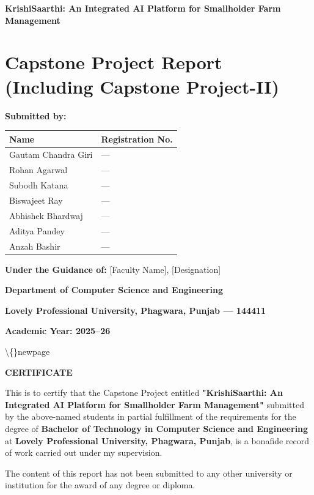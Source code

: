 \documentclass[12pt, a4paper]{report}
\begin{document}
\begin{center}
{\fontsize{14}{17}\bfseries KrishiSaarthi: An Integrated AI Platform for Smallholder Farm Management}\\
\end{center}
\section{Capstone Project Report (Including Capstone Project-II)}
\textbf{Submitted by:}

\begin{table}[htbp]
\centering
\small
\begin{tabularx}{\textwidth}{|X|X|}
\hline
Name & Registration No. \\
\hline
Gautam Chandra Giri & --- \\
Rohan Agarwal & --- \\
Subodh Katana & --- \\
Biswajeet Ray & --- \\
Abhishek Bhardwaj & --- \\
Aditya Pandey & --- \\
Anzah Bashir & --- \\
\hline
\end{tabularx}
\end{table}

\textbf{Under the Guidance of:} [Faculty Name], [Designation]

\textbf{Department of Computer Science and Engineering}

\textbf{Lovely Professional University, Phagwara, Punjab --- 144411}

\textbf{Academic Year: 2025--26}

\textbackslash\{\}newpage

\begin{center}
{\fontsize{14}{17}\bfseries CERTIFICATE}\\
\end{center}
This is to certify that the Capstone Project entitled \textbf{"KrishiSaarthi: An Integrated AI Platform for Smallholder Farm Management"} submitted by the above-named students in partial fulfillment of the requirements for the degree of \textbf{Bachelor of Technology in Computer Science and Engineering} at \textbf{Lovely Professional University, Phagwara, Punjab}, is a bonafide record of work carried out under my supervision.

The content of this report has not been submitted to any other university or institution for the award of any degree or diploma.
\end{document}
